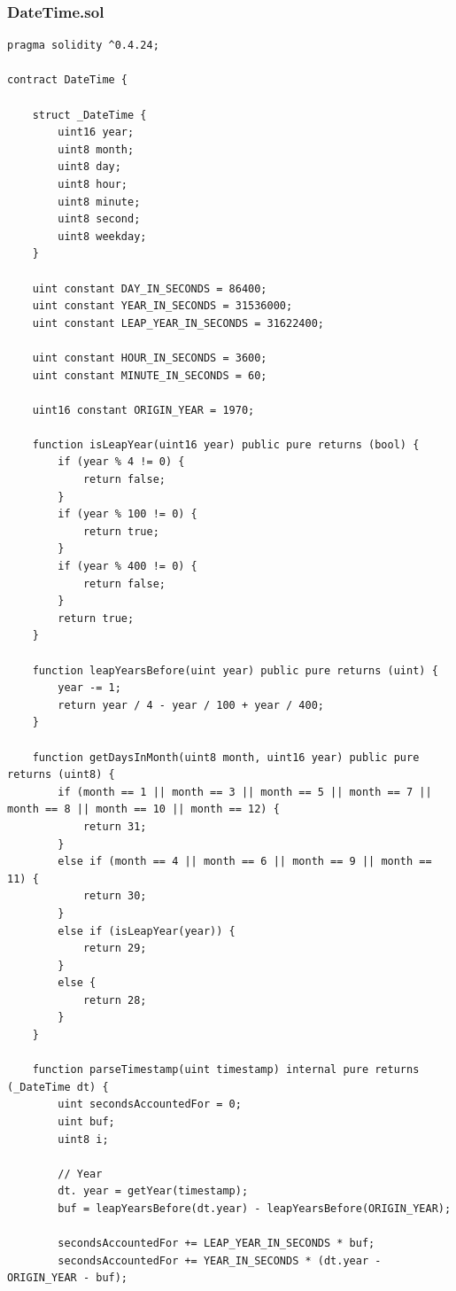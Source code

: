 \documentclass[a4paper]{article}
\begin{document}
\begin{frame}
\frametitle{DateTime.sol}
\begin{lstlisting}[language = Solidity] %basicstyle=\small]
pragma solidity ^0.4.24;

contract DateTime {

    struct _DateTime {
        uint16 year;
        uint8 month;
        uint8 day;
        uint8 hour;
        uint8 minute;
        uint8 second;
        uint8 weekday;
    }

    uint constant DAY_IN_SECONDS = 86400;
    uint constant YEAR_IN_SECONDS = 31536000;
    uint constant LEAP_YEAR_IN_SECONDS = 31622400;

    uint constant HOUR_IN_SECONDS = 3600;
    uint constant MINUTE_IN_SECONDS = 60;

    uint16 constant ORIGIN_YEAR = 1970;

    function isLeapYear(uint16 year) public pure returns (bool) {
        if (year % 4 != 0) {
            return false;
        }
        if (year % 100 != 0) {
            return true;
        }
        if (year % 400 != 0) {
            return false;
        }
        return true;
    }

    function leapYearsBefore(uint year) public pure returns (uint) {
        year -= 1;
        return year / 4 - year / 100 + year / 400;
    }

    function getDaysInMonth(uint8 month, uint16 year) public pure returns (uint8) {
        if (month == 1 || month == 3 || month == 5 || month == 7 || month == 8 || month == 10 || month == 12) {
            return 31;
        }
        else if (month == 4 || month == 6 || month == 9 || month == 11) {
            return 30;
        }
        else if (isLeapYear(year)) {
            return 29;
        }
        else {
            return 28;
        }
    }
    
    function parseTimestamp(uint timestamp) internal pure returns (_DateTime dt) {
        uint secondsAccountedFor = 0;
        uint buf;
        uint8 i;

        // Year
        dt. year = getYear(timestamp);
        buf = leapYearsBefore(dt.year) - leapYearsBefore(ORIGIN_YEAR);

        secondsAccountedFor += LEAP_YEAR_IN_SECONDS * buf;
        secondsAccountedFor += YEAR_IN_SECONDS * (dt.year - ORIGIN_YEAR - buf);


\end{lstlisting}
\end{frame}
\end{document}

